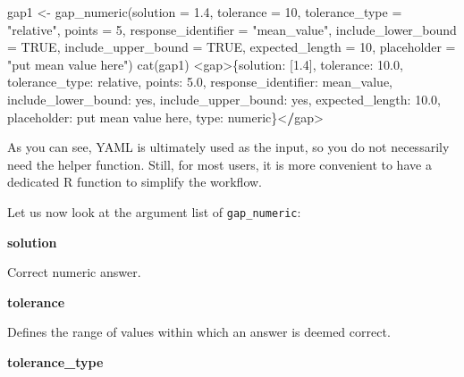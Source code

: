 \documentclass[twoside]{tufte-book}
\newenvironment{Shaded}{}{}
\newcommand{\AttributeTok}[1]{\textcolor[rgb]{0.49,0.56,0.16}{#1}}
\newcommand{\ConstantTok}[1]{\textcolor[rgb]{0.53,0.00,0.00}{#1}}
\newcommand{\DecValTok}[1]{\textcolor[rgb]{0.25,0.63,0.44}{#1}}
\newcommand{\ErrorTok}[1]{\textcolor[rgb]{1.00,0.00,0.00}{\textbf{#1}}}
\newcommand{\FloatTok}[1]{\textcolor[rgb]{0.25,0.63,0.44}{#1}}
\newcommand{\FunctionTok}[1]{\textcolor[rgb]{0.02,0.16,0.49}{#1}}
\newcommand{\NormalTok}[1]{#1}
\newcommand{\OtherTok}[1]{\textcolor[rgb]{0.00,0.44,0.13}{#1}}
\newcommand{\SpecialCharTok}[1]{\textcolor[rgb]{0.25,0.44,0.63}{#1}}
\newcommand{\StringTok}[1]{\textcolor[rgb]{0.25,0.44,0.63}{#1}}
\begin{document}
\begin{Shaded}
\begin{Highlighting}[]
\NormalTok{gap1 }\OtherTok{\textless{}{-}} \FunctionTok{gap\_numeric}\NormalTok{(}\AttributeTok{solution =} \FloatTok{1.4}\NormalTok{, }\AttributeTok{tolerance =} \DecValTok{10}\NormalTok{, }\AttributeTok{tolerance\_type =} \StringTok{"relative"}\NormalTok{,}
                    \AttributeTok{points =} \DecValTok{5}\NormalTok{, }\AttributeTok{response\_identifier =} \StringTok{"mean\_value"}\NormalTok{,}
                    \AttributeTok{include\_lower\_bound =} \ConstantTok{TRUE}\NormalTok{, }\AttributeTok{include\_upper\_bound =} \ConstantTok{TRUE}\NormalTok{,}
                    \AttributeTok{expected\_length =} \DecValTok{10}\NormalTok{, }\AttributeTok{placeholder =} \StringTok{"put mean value here"}\NormalTok{)}
\FunctionTok{cat}\NormalTok{(gap1)}
\SpecialCharTok{\textless{}}\NormalTok{gap}\SpecialCharTok{\textgreater{}}\NormalTok{\{solution}\SpecialCharTok{:}\NormalTok{ [}\FloatTok{1.4}\NormalTok{], tolerance}\SpecialCharTok{:} \FloatTok{10.0}\NormalTok{, tolerance\_type}\SpecialCharTok{:}\NormalTok{ relative, points}\SpecialCharTok{:} \FloatTok{5.0}\NormalTok{,}
\NormalTok{response\_identifier}\SpecialCharTok{:}\NormalTok{ mean\_value, include\_lower\_bound}\SpecialCharTok{:}\NormalTok{ yes,}
\NormalTok{include\_upper\_bound}\SpecialCharTok{:}\NormalTok{ yes, expected\_length}\SpecialCharTok{:} \FloatTok{10.0}\NormalTok{, placeholder}\SpecialCharTok{:}\NormalTok{ put mean value here,}
\NormalTok{type}\SpecialCharTok{:}\NormalTok{ numeric\}}\SpecialCharTok{\textless{}}\ErrorTok{/}\NormalTok{gap}\SpecialCharTok{\textgreater{}}
\end{Highlighting}
\end{Shaded}

As you can see, YAML is ultimately used as the input, so you do not necessarily need the helper function. Still, for most users, it is more convenient to have a dedicated R function to simplify the workflow.

Let us now look at the argument list of \texttt{gap\_numeric}:

\noindent\textbf{solution}\label{solution}

Correct numeric answer.

\noindent\textbf{tolerance}\label{tolerance}

Defines the range of values within which an answer is deemed correct.

\noindent\textbf{tolerance\_type}\label{tolerance_type}
\end{document}
